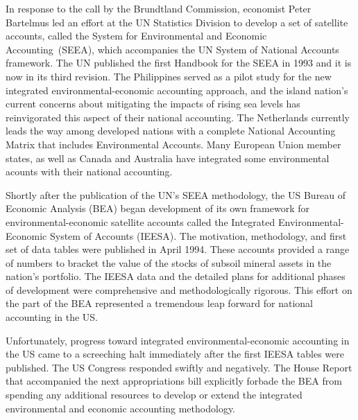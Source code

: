 In response to the call by the Brundtland Commission, 
economist Peter Bartelmus led an effort at the UN Statistics Division 
to develop a set of satellite accounts, 
called the System for Environmental and Economic Accounting~(SEEA),
which accompanies the UN System of National Accounts framework.\cite{bartelmus_integrated_1991}
The UN published the first Handbook for the SEEA in 1993 and it is now in 
its third revision.\cite{UNSEEA1993} 
The Philippines served as a pilot study for the new integrated environmental-economic
accounting approach, and the island nation's current concerns about mitigating the impacts of 
rising sea levels has reinvigorated this aspect 
of their national accounting.\cite{uno1998, PhilippinesSEEAWeb}
The Netherlands currently leads the way 
among developed nations with a complete  National Accounting Matrix that 
includes Environmental Accounts.\cite{DutchStats2009}
Many European Union member states, 
as well as Canada and Australia have integrated 
some environmental acounts with their national accounting.\cite{UNSEEAWeb} 

Shortly after the publication 
of the UN's SEEA methodology,
the US Bureau of Economic Analysis (BEA) began development of its own
framework for environmental-economic satellite accounts called the 
Integrated Environmental-Economic System of Accounts (IEESA). 
The motivation, methodology, and first set of data tables were published 
in April 1994.\cite{BEA1994a} 
These accounts provided a range of numbers to bracket the value
of the stocks of subsoil mineral assets in the nation's portfolio. 
The IEESA data and the detailed plans for additional phases 
of development were comprehensive and methodologically rigorous. 
This effort on the part of the BEA
represented a tremendous leap forward for 
national accounting in the US.

Unfortunately, progress toward integrated environmental-economic accounting 
in the US came to a screeching halt immediately after the first IEESA tables were published. 
The US Congress responded swiftly and negatively. The House Report that 
accompanied the next appropriations bill explicitly forbade the BEA from spending  
any additional resources to develop or extend
the integrated environmental and economic accounting methodology. 

